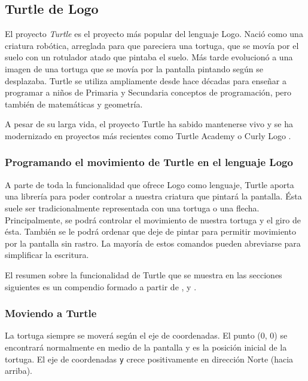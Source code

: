 \subsection{Turtle de Logo}
\label{sec:turtle}

El proyecto \emph{Turtle} es el proyecto más popular del lenguaje Logo. Nació como una criatura robótica, arreglada para que pareciera una tortuga, que se movía por el suelo con un rotulador atado que pintaba el suelo. Más tarde evolucionó a una imagen de una tortuga que se movía por la pantalla pintando según se desplazaba. Turtle se utiliza ampliamente desde hace décadas para enseñar a programar a niños de Primaria y Secundaria conceptos de programación, pero también de matemáticas y geometría\cite{abelson1980disessa,brown1995101}.

A pesar de su larga vida, el proyecto Turtle ha sabido mantenerse vivo y se ha modernizado en proyectos más recientes como Turtle Academy \cite{turtle-academy} o Curly Logo \cite{curly-logo}.


\subsubsection{Programando el movimiento de Turtle en el lenguaje Logo}
\label{sec:logo-turtle-lenguaje}

A parte de toda la funcionalidad que ofrece Logo como lenguaje, Turtle aporta una librería para poder controlar a nuestra criatura que pintará la pantalla. Ésta suele ser tradicionalmente representada con una tortuga o una flecha. Principalmente, se podrá controlar el movimiento de nuestra tortuga y el giro de ésta. También se le podrá ordenar que deje de pintar para permitir movimiento por la pantalla sin rastro. La mayoría de estos comandos pueden abreviarse para simplificar la escritura.

El resumen sobre la funcionalidad de Turtle que se muestra en las secciones siguientes es un compendio formado a partir de \cite{logo-turtle-lenguaje}, \cite{turtle-academy} y \cite{abelson1980disessa}.


\subsubsection*{Moviendo a Turtle}

La tortuga siempre se moverá según el eje de coordenadas. El punto (0, 0) se encontrará normalmente en medio de la pantalla y es la posición inicial de la tortuga. El eje de coordenadas \texttt{y} crece positivamente en dirección Norte (hacia arriba).

